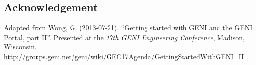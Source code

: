 \documentclass[12pt,letterpaper]{article}
\begin{document}
\subsection*{Acknowledgement}

Adapted from Wong, G. (2013-07-21).
``Getting started with GENI and the GENI Portal, part II''.
Presented at the \emph{17th GENI Engineering Conference}, Madison, Wisconsin.
\url{http://groups.geni.net/geni/wiki/GEC17Agenda/GettingStartedWithGENI_II}
\end{document}
